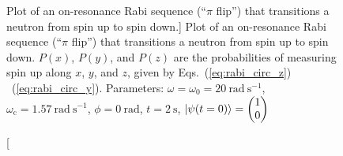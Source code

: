\begin{figure}
\begin{subfigure}{.45\textwidth}
\end{subfigure}
\caption
[Plot of an on-resonance Rabi sequence (``$\pi$ flip'') that transitions a neutron from spin up to spin down.]
{Plot of an on-resonance Rabi sequence (``$\pi$ flip'') that transitions a neutron from spin up to spin down. $P(x)$, $P(y)$, and $P(z)$ are the probabilities of measuring spin up along $x$, $y$, and $z$, given by Eqs.~(\ref{eq:rabi_circ_z}) \textendash ~(\ref{eq:rabi_circ_y}). Parameters: $\omega=\omega_0=\qty{20}{\radian\ \s^{-1}}$, $\omega_\text{c}=\qty{1.57}{\radian\ \s^{-1}}$, $\phi=\qty{0}{\radian}$, $t=\qty{2}{\s}$, $\Ket{\psi(t=0)}=\left( \begin{matrix}
    1 \\
    0
\end{matrix}\right)$}
\label{fig:rabi_circ_pi_pulse}


\end{figure}
